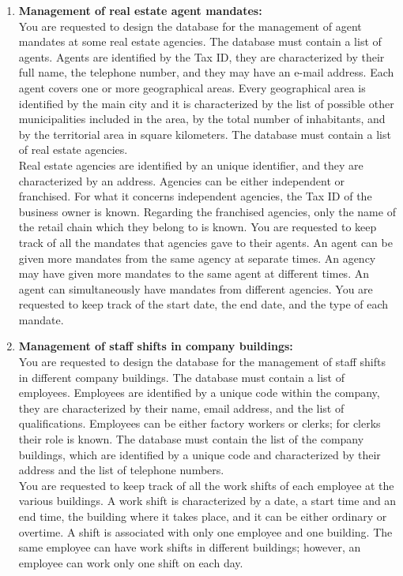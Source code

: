 \documentclass{article}
\begin{document}
\begin{enumerate}
    \item \textbf{Management of real estate agent mandates:} \\
    You are requested to design the database for the management of agent mandates at some real estate agencies. The database must contain a list of agents. Agents are identified by the Tax ID, they are characterized by their full name, the telephone number, and they may have an e-mail address. Each agent covers one or more geographical areas. Every geographical area is identified by the main city and it is characterized by the list of possible other municipalities included in the area, by the total number of inhabitants, and by the territorial area in square kilometers. The database must contain a list of real estate agencies. \\

    Real estate agencies are identified by an unique identifier, and they are characterized by an address. Agencies can be either independent or franchised. For what it concerns independent agencies, the Tax ID of the business owner is known. Regarding the franchised agencies, only the name of the retail chain which they belong to is known. You are requested to keep track of all the mandates that agencies gave to their agents. An agent can be given more mandates from the same agency at separate times. An agency may have given more mandates to the same agent at different times. An agent can simultaneously have mandates from different agencies. You are requested to keep track of the start date, the end date, and the type of each mandate.

    \item \textbf{Management of staff shifts in company buildings:} \\
    You are requested to design the database for the management of staff shifts in different company buildings. The database must contain a list of employees. Employees are identified by a unique code within the company, they are characterized by their name, email address, and the list of qualifications. Employees can be either factory workers or clerks; for clerks their role is known. The database must contain the list of the company buildings, which are identified by a unique code and characterized by their address and the list of telephone numbers. \\

    You are requested to keep track of all the work shifts of each employee at the various buildings. A work shift is characterized by a date, a start time and an end time, the building where it takes place, and it can be either ordinary or overtime. A shift is associated with only one employee and one building. The same employee can have work shifts in different buildings; however, an employee can work only one shift on each day.
\end{enumerate}
\end{document}
